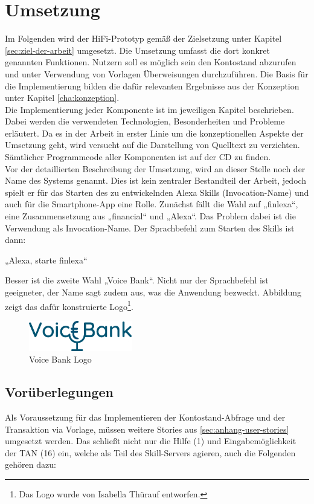 \chapter{Umsetzung}
\label{cha:umsetzung}
Im Folgenden wird der \ac{HiFi}-Prototyp gemäß der Zielsetzung unter Kapitel \ref{sec:ziel-der-arbeit} umgesetzt. Die Umsetzung umfasst die dort konkret genannten Funktionen. Nutzern soll es möglich sein den Kontostand abzurufen und unter Verwendung von Vorlagen Überweisungen durchzuführen. Die Basis für die Implementierung bilden die dafür relevanten Ergebnisse aus der Konzeption unter Kapitel \ref{cha:konzeption}.\\
Die Implementierung jeder Komponente ist im jeweiligen Kapitel beschrieben. Dabei werden die verwendeten Technologien, Besonderheiten und Probleme erläutert. Da es in der Arbeit in erster Linie um die konzeptionellen Aspekte der Umsetzung geht, wird versucht auf die Darstellung von Quelltext zu verzichten. Sämtlicher Programmcode aller Komponenten ist auf der CD zu finden.\\
Vor der detaillierten Beschreibung der Umsetzung, wird an dieser Stelle noch der Name des Systems genannt. Dies ist kein zentraler Bestandteil der Arbeit, jedoch spielt er für das Starten des zu entwickelnden Alexa Skills (Invocation-Name) und auch für die Smartphone-App eine Rolle. Zunächst fällt die Wahl auf „finlexa“, eine Zusammensetzung aus „financial“ und „Alexa“. Das Problem dabei ist die Verwendung als Invocation-Name. Der Sprachbefehl zum Starten des Skills ist dann: 

\begin{center}
    „Alexa, starte finlexa“
\end{center}

Besser ist die zweite Wahl „Voice Bank“. Nicht nur der Sprachbefehl ist geeigneter, der Name sagt zudem aus, was die Anwendung bezweckt. Abbildung zeigt das dafür konstruierte Logo\footnote{Das Logo wurde von Isabella Thürauf entworfen.}.

\begin{figure}[h]
  \centering
  \includegraphics[width=0.4\textwidth]{bilder/4_logo.png}
  \caption{Voice Bank Logo}
  \label{fig:voicebank-logo}
\end{figure}

\section{Vorüberlegungen}
\label{sec:umsetzung-vorueberlegung}
Als Voraussetzung für das Implementieren der Kontostand-Abfrage und der Transaktion via Vorlage, müssen weitere Stories aus \ref{sec:anhang-user-stories} umgesetzt werden. Das schließt nicht nur die Hilfe (1) und Eingabemöglichkeit der TAN (16) ein, welche als Teil des Skill-Servers agieren, auch die Folgenden gehören dazu:

